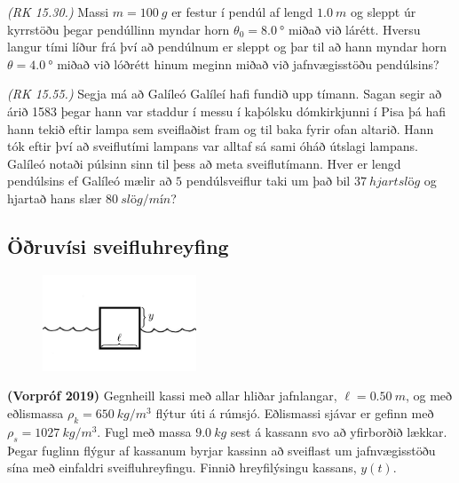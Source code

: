 \ifdefined \wholebook \else\documentclass[oneside]{book}\usepackage{EdlBook}\graphicspath{{figures/}}
\begin{document}
\begin{enumerate}[label = \textbf{Dæmi \thechapter.\arabic*.}]
\item \textit{(RK 15.30.)} Massi $m = \SI{100}{g}$ er festur í pendúl af lengd $\SI{1.0}{m}$ og sleppt úr kyrrstöðu þegar pendúllinn myndar horn $\theta_0 = \SI{8.0}{\degree}$ miðað við lárétt. Hversu langur tími líður frá því að pendúlnum er sleppt og þar til að hann myndar horn $\theta = \SI{4.0}{\degree}$ miðað við lóðrétt hinum meginn miðað við jafnvægisstöðu pendúlsins?

\item \textit{(RK 15.55.)} Segja má að Galíleó Galíleí hafi fundið upp tímann. Sagan segir að árið 1583 þegar hann var staddur í messu í kaþólsku dómkirkjunni í Pisa þá hafi hann tekið eftir lampa sem sveiflaðist fram og til baka fyrir ofan altarið. Hann tók eftir því að sveiflutími lampans var alltaf sá sami óháð útslagi lampans. Galíleó notaði púlsinn sinn til þess að meta sveiflutímann. Hver er lengd pendúlsins ef Galíleó mælir að $5$ pendúlsveiflur taki um það bil $\SI{37}{hjartslög}$ og hjartað hans slær $\SI{80}{slög/mín}$?



\subsection*{Öðruvísi sveifluhreyfing}

\begin{minipage}{\linewidth}

\begin{figure}
\vspace{-1cm}
\includegraphics[width=1.8in]{images/kubbursjor.png}
\end{figure}
\item \textbf{(Vorpróf 2019)} Gegnheill kassi með allar hliðar jafnlangar, $\ell = \SI{0.50}{m}$, og með eðlismassa $\rho_k = \SI{650}{kg/m^3}$ flýtur úti á rúmsjó. Eðlismassi sjávar er gefinn með $\rho_s = \SI{1027}{kg/m^3}$. Fugl með massa $\SI{9.0}{kg}$ sest á kassann svo að yfirborðið lækkar. Þegar fuglinn flýgur af kassanum byrjar kassinn að sveiflast um jafnvægisstöðu sína með einfaldri sveifluhreyfingu. Finnið hreyfilýsingu kassans, $y(t)$.
\end{minipage}


\end{enumerate}
\end{document}
